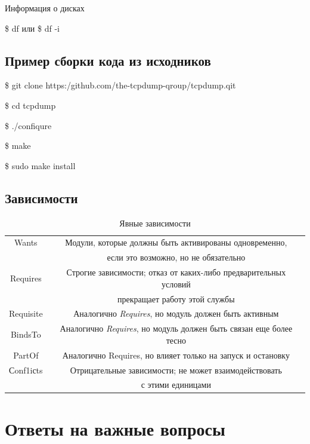 \documentclass[oneside, final, 14pt]{extreport} %
\begin{document}
Информация о дисках

\$ df или \$ df -i








\subsection{Пример сборки кода из исходников}


    

\$ git clone https:/github.com/the-tcpdump-qroup/tcpdump.qit

\$ cd tcpdump

\$ ./confiqure

\$ make

\$ sudo make install

\subsection{Зависимости}

\begin{table}[t]
    \centering
    \begin{tabular}{|c|c|}
    \hline
    Wants & Модули, которые должны быть активированы одновременно,\\ 
    & если это возможно, но не обязательно \\
    \hline
    Requires & Строгие зависимости; отказ от каких-либо предварительных условий \\ 
    &прекращает работу этой службы \\
    \hline
    Requisite & Аналогично \textit{Requires}, но модуль должен быть активным \\
    \hline
    BindsTo & Аналогично \textit{Requires}, но модуль должен быть связан еще более тесно \\
    \hline
    PartOf & Аналогично Requires, но влияет только на запуск и остановку \\
    \hline
    Сonf1iсts & Отрицательные зависимости; не может взаимодействовать \\ &
    с этими единицами \\
    \hline
    \end{tabular}
    \caption{Явные зависимости}
\end{table}

\section{Ответы на важные вопросы}
\end{document}
